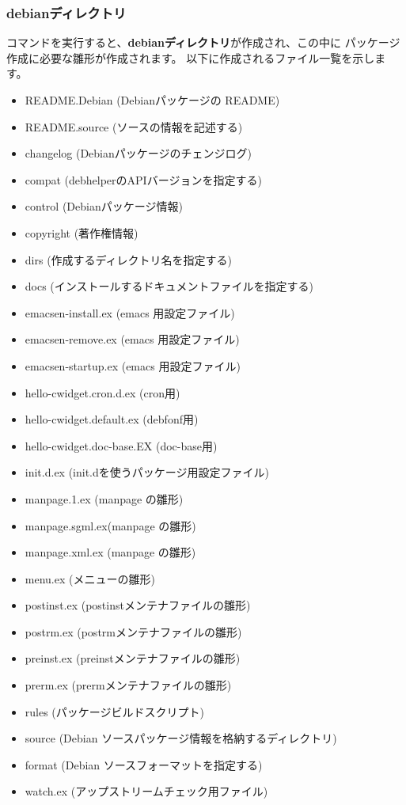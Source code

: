 \documentclass[mingoth,a4paper]{jsarticle}
\begin{document}
\subsubsection{debianディレクトリ}
コマンドを実行すると、{\bf debianディレクトリ}が作成され、この中に
パッケージ作成に必要な雛形が作成されます。
以下に作成されるファイル一覧を示します。

\begin{itemize}
\item README.Debian  (Debianパッケージの README)
\item README.source  (ソースの情報を記述する)
\item changelog      (Debianパッケージのチェンジログ)
\item compat         (debhelperのAPIバージョンを指定する)
\item control        (Debianパッケージ情報)
\item copyright      (著作権情報)
\item dirs           (作成するディレクトリ名を指定する)
\item docs           (インストールするドキュメントファイルを指定する)
\item emacsen-install.ex (emacs 用設定ファイル)
\item emacsen-remove.ex  (emacs 用設定ファイル)
\item emacsen-startup.ex (emacs 用設定ファイル)
\item hello-cwidget.cron.d.ex (cron用)
\item hello-cwidget.default.ex (debfonf用)
\item hello-cwidget.doc-base.EX (doc-base用)
\item init.d.ex      (init.dを使うパッケージ用設定ファイル)
\item manpage.1.ex   (manpage の雛形)
\item manpage.sgml.ex(manpage の雛形)
\item manpage.xml.ex (manpage の雛形)
\item menu.ex        (メニューの雛形)
\item postinst.ex    (postinstメンテナファイルの雛形)
\item postrm.ex      (postrmメンテナファイルの雛形)
\item preinst.ex     (preinstメンテナファイルの雛形)
\item prerm.ex       (prermメンテナファイルの雛形)
\item rules          (パッケージビルドスクリプト)
\item source         (Debian ソースパッケージ情報を格納するディレクトリ)
\item format     (Debian ソースフォーマットを指定する)
\item watch.ex       (アップストリームチェック用ファイル)

\end{itemize}
\end{document}
